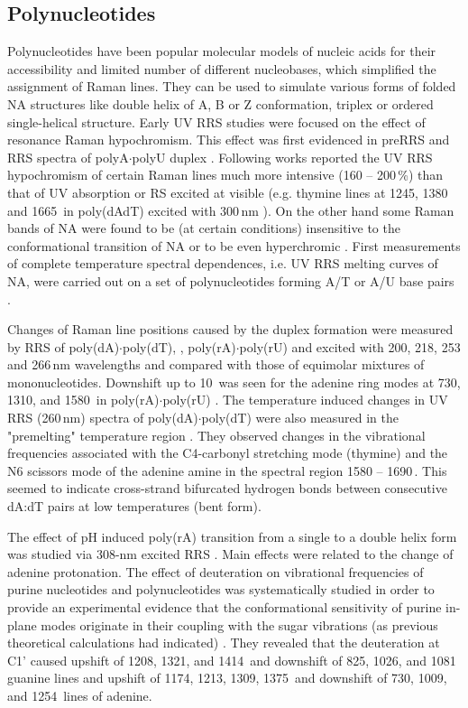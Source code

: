 \subsection{Polynucleotides}

Polynucleotides have been popular molecular models of nucleic acids for their
accessibility and limited number of different nucleobases, which simplified the
assignment of Raman lines.
They can be used to simulate various forms of folded NA structures like double
helix of A, B or Z conformation, triplex or ordered single-helical structure.
Early UV RRS studies were focused on the effect of resonance Raman
hypochromism.
This effect was first evidenced in preRRS and RRS spectra of polyA$\cdot$polyU
duplex
\parencite{Pezolet1975}.
Following works reported the UV RRS hypochromism of certain Raman lines much
more intensive (160 -- 200\,\%) than that of UV absorption or RS excited at
visible (e.g. thymine lines at 1245, 1380 and 1665\,\icm{} in poly(dAdT)
excited with 300\,nm
\cite{Chinsky1982a}).
On the other hand some Raman bands of NA were found to be (at certain
conditions) insensitive to the conformational transition of NA or to be even
hyperchromic
\parencite{Chinsky1980}.
First measurements of complete temperature spectral dependences, i.e. UV RRS
melting curves of NA, were carried out on a set of polynucleotides forming A/T
or A/U base pairs
\parencite{Jolles1985}.

Changes of Raman line positions caused by the duplex formation were measured by
RRS of
	poly(dA)$\cdot$poly(dT),
	,
	poly(rA)$\cdot$poly(rU)
	and 
excited with 200, 218, 253 and 266\,nm wavelengths and compared with those of
equimolar mixtures of mononucleotides.
Downshift up to 10\,\icm{} was seen for the adenine ring modes at 730, 1310,
and 1580\,\icm{} in poly(rA)$\cdot$poly(rU)
\parencite{Grygon1990}.
The temperature induced changes in UV RRS (260\,nm) spectra of
poly(dA)$\cdot$poly(dT) were also measured in the "premelting" temperature
region
\parencite{Chan1997}.
They observed changes in the vibrational frequencies associated with the
C4-carbonyl stretching mode (thymine) and the N6 scissors mode of the adenine
amine in the spectral region 1580 -- 1690\,\icm{}.
This seemed to indicate cross-strand bifurcated hydrogen bonds between
consecutive dA:dT pairs at low temperatures (bent form).

The effect of pH induced poly(rA) transition from a single to a double helix
form was studied via 308-nm excited RRS
\parencite{Gfrorer1989}.
Main effects were related to the change of adenine protonation.
The effect of deuteration on vibrational frequencies of purine nucleotides and
polynucleotides was systematically studied in order to provide an experimental
evidence that the conformational sensitivity of purine in-plane modes originate
in their coupling with the sugar vibrations (as previous theoretical
calculations had indicated)
\parencite{Toyama1993}.
They revealed that the deuteration at C1' caused upshift of 1208, 1321, and
1414\,\icm{} and downshift of 825, 1026, and 1081\,\icm{} guanine lines and
upshift of 1174, 1213, 1309, 1375\,\icm{} and downshift of 730, 1009, and
1254\,\icm{} lines of adenine.

